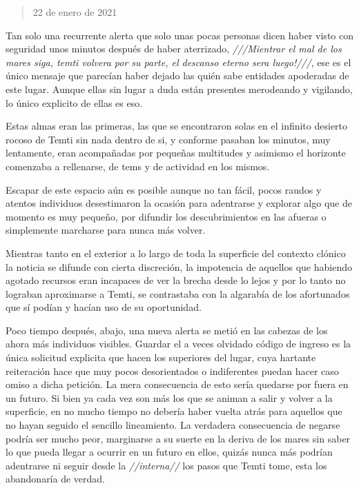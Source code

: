 \documentclass[
  spanish,
]{book}
\begin{document}
\begin{quote}
22 de enero de 2021
\end{quote}

Tan solo una recurrente alerta que solo unas pocas personas dicen haber visto con seguridad unos minutos después de haber aterrizado, \emph{///Mientrar el mal de los mares siga, temti volvera por su parte, el descanso eterno sera luego!///}, ese es el único mensaje que parecían haber dejado las quién sabe entidades apoderadas de este lugar. Aunque ellas sin lugar a duda están presentes merodeando y vigilando, lo único explicito de ellas es eso.

Estas almas eran las primeras, las que se encontraron solas en el infinito desierto rocoso de Temti sin nada dentro de si, y conforme pasaban los minutos, muy lentamente, eran acompañadas por pequeñas multitudes y asimismo el horizonte comenzaba a rellenarse, de tems y de actividad en los mismos.

Escapar de este espacio aún es posible aunque no tan fácil, pocos raudos y atentos individuos desestimaron la ocasión para adentrarse y explorar algo que de momento es muy pequeño, por difundir los descubrimientos en las afueras o simplemente marcharse para nunca más volver.

Mientras tanto en el exterior a lo largo de toda la superficie del contexto clónico la noticia se difunde con cierta discreción, la impotencia de aquellos que habiendo agotado recursos eran incapaces de ver la brecha desde lo lejos y por lo tanto no lograban aproximarse a Temti, se contrastaba con la algarabía de los afortunados que sí podían y hacían uso de su oportunidad.

Poco tiempo después, abajo, una nueva alerta se metió en las cabezas de los ahora más individuos visibles. Guardar el a veces olvidado código de ingreso es la única solicitud explicita que hacen los superiores del lugar, cuya hartante reiteración hace que muy pocos desorientados o indiferentes puedan hacer caso omiso a dicha petición. La mera consecuencia de esto sería quedarse por fuera en un futuro. Si bien ya cada vez son más los que se animan a salir y volver a la superficie, en no mucho tiempo no debería haber vuelta atrás para aquellos que no hayan seguido el sencillo lineamiento. La verdadera consecuencia de negarse podría ser mucho peor, marginarse a su suerte en la deriva de los mares sin saber lo que pueda llegar a ocurrir en un futuro en ellos, quizás nunca más podrían adentrarse ni seguir desde la \emph{//interna//} los pasos que Temti tome, esta los abandonaría de verdad.
\end{document}
